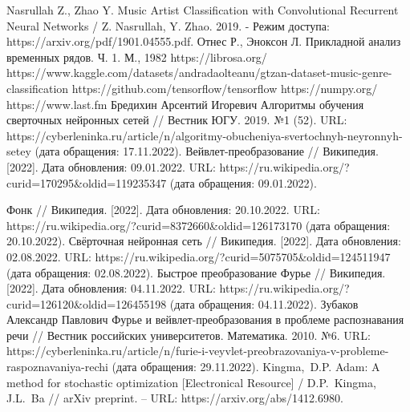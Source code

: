 \begin{thebibliography}{99}
 Nasrullah Z., Zhao Y. Music Artist Classification with Convolutional Recurrent Neural Networks / Z. Nasrullah, Y. Zhao. 2019. - Режим доступа: https://arxiv.org/pdf/1901.04555.pdf.
 Отнес Р., Эноксон Л. Прикладной анализ временных рядов. Ч. 1. М., 1982
 https://librosa.org/
 https://www.kaggle.com/datasets/andradaolteanu/gtzan-dataset-music-genre-classification
 https://github.com/tensorflow/tensorflow
 https://numpy.org/
 https://www.last.fm
 Бредихин Арсентий Игоревич Алгоритмы обучения сверточных нейронных сетей // Вестник ЮГУ. 2019. №1 (52). URL: https://cyberleninka.ru/article/n/algoritmy-obucheniya-svertochnyh-neyronnyh-setey (дата обращения: 17.11.2022).
 Вейвлет-преобразование // Википедия. [2022]. Дата обновления: 09.01.2022. URL: https://ru.wikipedia.org/?curid=170295\&oldid=119235347 (дата обращения: 09.01.2022). 

 Фонк // Википедия. [2022]. Дата обновления: 20.10.2022. URL: https://ru.wikipedia.org/?curid=8372660\&oldid=126173170 (дата обращения: 20.10.2022). 
 Свёрточная нейронная сеть // Википедия. [2022]. Дата обновления: 02.08.2022. URL: https://ru.wikipedia.org/?curid=5075705\&oldid=124511947 (дата обращения: 02.08.2022). 
 Быстрое преобразование Фурье // Википедия. [2022]. Дата обновления: 04.11.2022. URL: https://ru.wikipedia.org/?curid=126120\&oldid=126455198 (дата обращения: 04.11.2022). 
 Зубаков Александр Павлович Фурье и вейвлет-преобразования в проблеме распознавания речи // Вестник российских университетов. Математика. 2010. №6. URL: https://cyberleninka.ru/article/n/furie-i-veyvlet-preobrazovaniya-v-probleme-raspoznavaniya-rechi (дата обращения: 29.11.2022).
 Kingma, D.P. Adam: A method for stochastic optimization [Electronical Resource] / D.P. Kingma, J.L. Ba // arXiv preprint. – URL: https://arxiv.org/abs/1412.6980.
\end{thebibliography}

